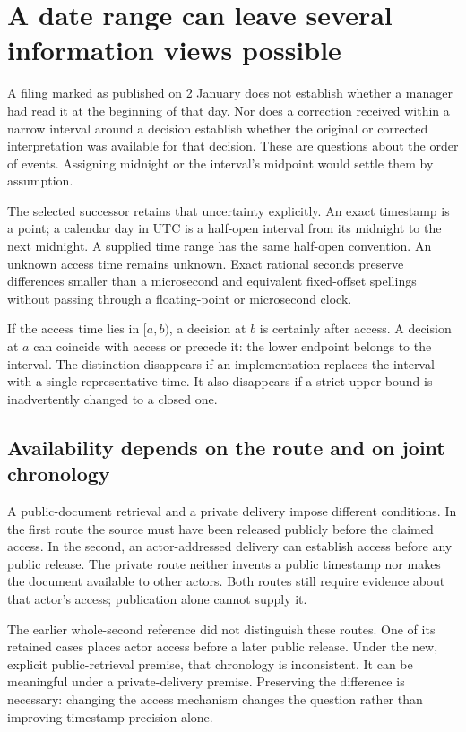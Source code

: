 \section{A date range can leave several information views possible}
\label{sim:exact-temporal-views}

A filing marked as published on 2 January does not establish whether a manager had read it at the beginning of that day. Nor does a correction received within a narrow interval around a decision establish whether the original or corrected interpretation was available for that decision. These are questions about the order of events. Assigning midnight or the interval's midpoint would settle them by assumption.

The selected successor retains that uncertainty explicitly. An exact timestamp is a point; a calendar day in UTC is a half-open interval from its midnight to the next midnight. A supplied time range has the same half-open convention. An unknown access time remains unknown. Exact rational seconds preserve differences smaller than a microsecond and equivalent fixed-offset spellings without passing through a floating-point or microsecond clock.

If the access time lies in $[a,b)$, a decision at $b$ is certainly after access. A decision at $a$ can coincide with access or precede it: the lower endpoint belongs to the interval. The distinction disappears if an implementation replaces the interval with a single representative time. It also disappears if a strict upper bound is inadvertently changed to a closed one.

\subsection{Availability depends on the route and on joint chronology}

A public-document retrieval and a private delivery impose different conditions. In the first route the source must have been released publicly before the claimed access. In the second, an actor-addressed delivery can establish access before any public release. The private route neither invents a public timestamp nor makes the document available to other actors. Both routes still require evidence about that actor's access; publication alone cannot supply it.

The earlier whole-second reference did not distinguish these routes. One of its retained cases places actor access before a later public release. Under the new, explicit public-retrieval premise, that chronology is inconsistent. It can be meaningful under a private-delivery premise. Preserving the difference is necessary: changing the access mechanism changes the question rather than improving timestamp precision alone.

